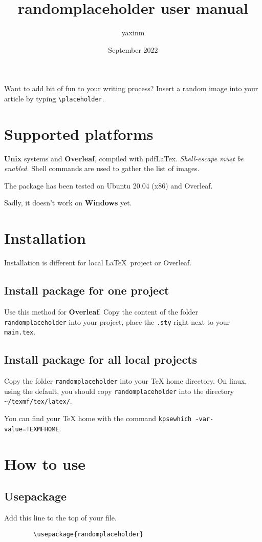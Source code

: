 \documentclass[12pt]{article}
\title{randomplaceholder user manual}
\author{yaxinm}
\date{September 2022}
\begin{document}
    \maketitle
    Want to add bit of fun to your writing process?
    Insert a random image into your article by typing \lstinline{\placeholder}. 
    \section{Supported platforms}
    \textbf{Unix} systems and \textbf{Overleaf}, compiled with pdfLaTex. 
    \textit{Shell-escape must be enabled.} Shell commands are used to gather the list of images.

    The package has been tested on Ubuntu 20.04 (x86) and Overleaf.
    
    Sadly, it doesn't work on \textbf{Windows} yet.

    \section{Installation}
    Installation is different for local \LaTeX~project or Overleaf.

    \subsection{Install package for one project}
    Use this method for \textbf{Overleaf}.
    Copy the content of the folder \lstinline{randomplaceholder} into your project, place the \lstinline{.sty} right next to your \lstinline{main.tex}. 
    
    \subsection{Install package for all local projects}
    Copy the folder \lstinline{randomplaceholder} into your TeX home directory. On linux, using the default, you should copy \lstinline{randomplaceholder} into the directory \lstinline{~/texmf/tex/latex/}.

    You can find your TeX home with the command \lstinline{kpsewhich -var-value=TEXMFHOME}.



    \section{How to use}

    \subsection{Usepackage}
    Add this line to the top of your file.
    \begin{lstlisting}
        \usepackage{randomplaceholder}
    \end{lstlisting}
\end{document}
